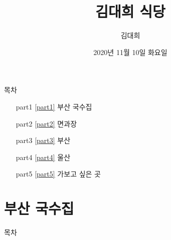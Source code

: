 \documentclass[aspectratio=1610,17pt,xcolor=pdftex,dvipsnames,table,handout]{beamer}
\begin{document}
	

			\title{ 김대희 식당 }
			\author{ 김대희 }
			\date{ 2020년 11월 10일 화요일 }


%
%


		\begin{frame}[plain]
		\titlepage
		\end{frame}


		\begin{frame} [plain]{목차}
		\tableofcontents%


			\setlength{\leftmargini}{ 2em}			
			\begin{itemize}

				\item [part1] \ref{part1}	부산 국수집
				\item [part2] \ref{part2}	면과장
				\item [part3] \ref{part3}	부산
				\item [part4] \ref{part4}	울산
				\item [part5] \ref{part5}	가보고 싶은 곳

			\end{itemize}



		\end{frame}



		\part{ 부산 국수집}
		\frame{\partpage}


		\begin{frame} [plain]{목차}
		\tableofcontents%

\label{part1} 	%

		\end{frame}
		
\end{document}
